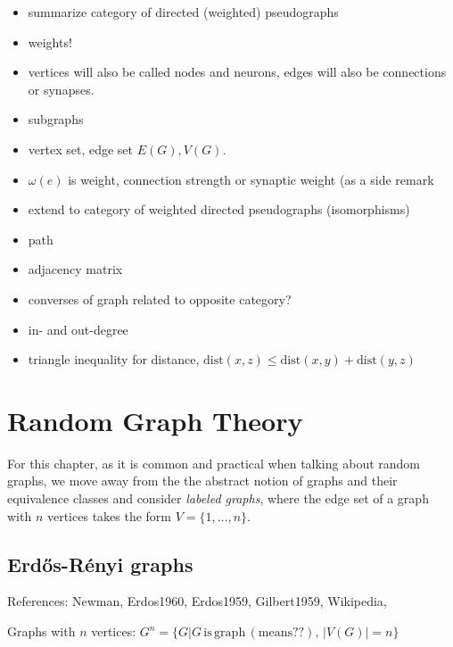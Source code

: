 \begin{itemize}
\item summarize category of directed (weighted) pseudographs
\item weights!
\item vertices will also be called nodes and neurons, edges will also
  be connections or synapses.
\item subgraphs
\item vertex set, edge set $E(G), V(G)$.
\item $\omega(e)$ is weight, connection strength or synaptic weight
  (as a side remark
\item extend to category of weighted directed pseudographs
  (isomorphisms)
\item path
\item adjacency matrix
\item converses of graph related to opposite category?
\item in- and out-degree
\item triangle inequality for distance, $\mathrm{dist}(x,z) \leq
  \mathrm{dist}(x,y) + \mathrm{dist}(y,z)$
\end{itemize}

\bigskip

\section{Random Graph Theory}

For this chapter, as it is common and practical when talking about
random graphs, we move away from the the abstract notion of graphs and
their equivalence classes and consider \textit{labeled graphs}, where
the edge set of a graph with $n$ vertices takes the form $V =
\{1,\ldots,n\}$.

\subsection{Erd\H{o}s-R\'{e}nyi graphs}

References: Newman, Erdos1960, Erdos1959, Gilbert1959, 
Wikipedia, \parencite{West_Graph-theory}
		
		
\begin{defn}
  Graphs with $n$ vertices: $G^n = \{G| G\,\mathrm{is\,
    graph\,(means??)},\, |V(G)| = n\}$
\end{defn}
		
